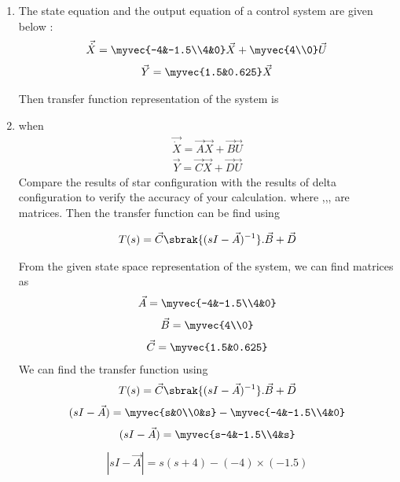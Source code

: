 \begin{enumerate}[label=\thesection.\arabic*.,ref=\thesection.\theenumi]

\item
The state equation and the output equation of a control system are given below : 
\begin{align}
    \vec{\dot X}=\myvec{-4&-1.5\\4&0}\vec{X} + \myvec{4\\0}\vec{U}   
\end{align}
\begin{align}
    \vec{Y} = \myvec{1.5&0.625}\vec{X}
\end{align}
  
Then transfer function representation of the system is 


\item 
\solution
when
\begin{align}
    \vec{\dot{X}} = \vec{A}\vec{X} + \vec{B}\vec{U}
\end{align}
\begin{align}
    \vec{Y} = \vec{C}\vec{X} + \vec{D}\vec{U}
\end{align}
Compare the results of star configuration with the results of delta configuration to verify the
accuracy of your calculation.
where ,,,  are matrices.
  Then the  transfer  function can be find using

\begin{align}
    T(s) = \vec{C}\sbrak{(sI-\vec{A})^{-1}}.\vec{B} + \vec{D}
\end{align}

From the given state space representation of the system, we can find matrices as
\begin{align}
    \vec{A}= \myvec{-4&-1.5\\4&0}
\end{align}
\begin{align}
    \vec{B} = \myvec{4\\0}
\end{align}
\begin{align}
     \vec{C} = \myvec{1.5&0.625}
\end{align}
We can find the transfer function using
\begin{align}
    T(s) = \vec{C}\sbrak{(sI-\vec{A})^{-1}}.\vec{B} + \vec{D}
\end{align}
\begin{align}
    (sI - \vec{A}) =  \myvec{s&0\\0&s} -  \myvec{-4&-1.5\\4&0}
\end{align}
\begin{align}
    (sI - \vec{A}) =  \myvec{s-4&-1.5\\4&s}
\end{align}
\begin{align}
    |sI - \vec{A}| = s(s+4) - (-4)\times (-1.5)
\end{align}


\end{enumerate}
